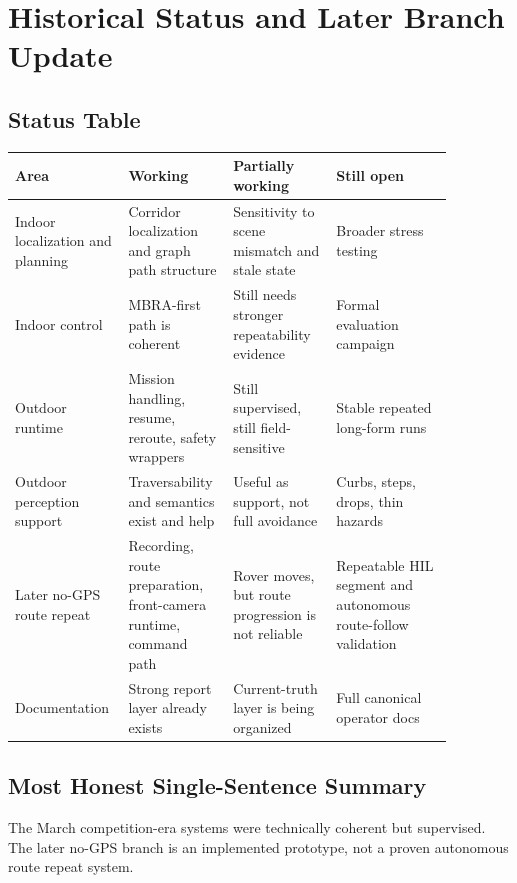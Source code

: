 \documentclass[11pt]{article}
\begin{document}
\section{Historical Status and Later Branch Update}
\subsection{Status Table}
\begin{longtable}{p{0.18\linewidth} p{0.22\linewidth} p{0.22\linewidth} p{0.25\linewidth}}
\toprule
\textbf{Area} & \textbf{Working} & \textbf{Partially working} & \textbf{Still open} \\
\midrule
Indoor localization and planning & Corridor localization and graph path structure & Sensitivity to scene mismatch and stale state & Broader stress testing \\
\addlinespace
Indoor control & MBRA-first path is coherent & Still needs stronger repeatability evidence & Formal evaluation campaign \\
\addlinespace
Outdoor runtime & Mission handling, resume, reroute, safety wrappers & Still supervised, still field-sensitive & Stable repeated long-form runs \\
\addlinespace
Outdoor perception support & Traversability and semantics exist and help & Useful as support, not full avoidance & Curbs, steps, drops, thin hazards \\
\addlinespace
Later no-GPS route repeat & Recording, route preparation, front-camera runtime, command path & Rover moves, but route progression is not reliable & Repeatable HIL segment and autonomous route-follow validation \\
\addlinespace
Documentation & Strong report layer already exists & Current-truth layer is being organized & Full canonical operator docs \\
\bottomrule
\end{longtable}

\subsection{Most Honest Single-Sentence Summary}
The March competition-era systems were technically coherent but supervised. The
later no-GPS branch is an implemented prototype, not a proven autonomous route
repeat system.
\end{document}
